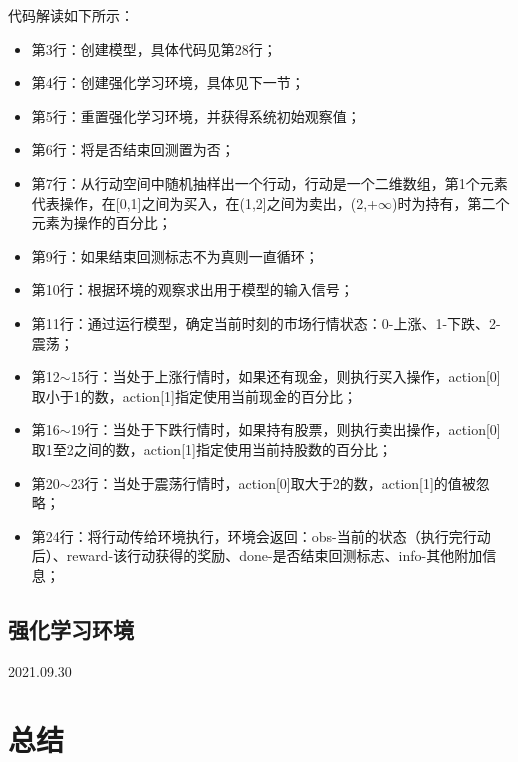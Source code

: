 代码解读如下所示：
\begin{itemize}
    \item 第3行：创建模型，具体代码见第28行；
    \item 第4行：创建强化学习环境，具体见下一节；
    \item 第5行：重置强化学习环境，并获得系统初始观察值；
    \item 第6行：将是否结束回测置为否；
    \item 第7行：从行动空间中随机抽样出一个行动，行动是一个二维数组，第1个元素代表操作，在[0,1]之间为买入，在(1,2]之间为卖出，(2,+$\infty$)时为持有，第二个
    元素为操作的百分比；
    \item 第9行：如果结束回测标志不为真则一直循环；
    \item 第10行：根据环境的观察求出用于模型的输入信号；
    \item 第11行：通过运行模型，确定当前时刻的市场行情状态：0-上涨、1-下跌、2-震荡；
    \item 第12$\sim$15行：当处于上涨行情时，如果还有现金，则执行买入操作，action[0]取小于1的数，action[1]指定使用当前现金的百分比；
    \item 第16$\sim$19行：当处于下跌行情时，如果持有股票，则执行卖出操作，action[0]取1至2之间的数，action[1]指定使用当前持股数的百分比；
    \item 第20$\sim$23行：当处于震荡行情时，action[0]取大于2的数，action[1]的值被忽略；
    \item 第24行：将行动传给环境执行，环境会返回：obs-当前的状态（执行完行动后）、reward-该行动获得的奖励、done-是否结束回测标志、info-其他附加信息；
\end{itemize}

\subsection{强化学习环境}
2021.09.30

\section{总结}